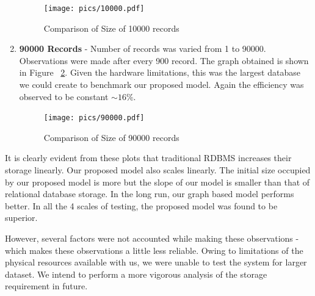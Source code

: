 \documentclass[12pt, oneside]{book}
\begin{document}
\begin{enumerate}
 \begin{figure}[H]
  \begin{center}
   \texttt{[image: pics/10000.pdf]}
   \caption{Comparison of Size of 10000 records}
   \label{fig:10000result}
  \end{center}
 \end{figure}
 \item \textbf{90000 Records} - Number of records was varied from 1 to 90000. Observations were made after every 900 record. The graph obtained is shown in Figure ~\ref{fig:90000result}. Given the hardware limitations, this was the largest database we could create to benchmark our proposed model. Again the efficiency was observed to be constant $\sim16\%$.
 \begin{figure}[ht]
  \begin{center}
   \texttt{[image: pics/90000.pdf]}
   \caption{Comparison of Size of 90000 records}
   \label{fig:90000result}
  \end{center}
 \end{figure}
\end{enumerate}
\par
It is clearly evident from these plots that traditional RDBMS increases their storage linearly. Our proposed model also scales linearly. The initial size occupied by our proposed model is more but the slope of our model is smaller than that of relational database storage. In the long run, our graph based model performs better. In all the 4 scales of testing, the proposed model was found to be superior. \par 
However, several factors were not accounted while making these observations - which makes these observations a little less reliable. Owing to limitations of the physical resources available with us, we were unable to test the system for larger dataset. We intend to perform a more vigorous analysis of the storage requirement in future.
\end{document}
